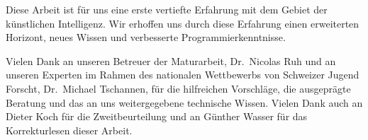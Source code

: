 Diese Arbeit ist für uns eine erste vertiefte Erfahrung mit dem Gebiet der
künstlichen Intelligenz. Wir erhoffen uns durch diese Erfahrung einen
erweiterten Horizont, neues Wissen und verbesserte Programmierkenntnisse.
    
Vielen Dank an unseren Betreuer der Maturarbeit, Dr.\ Nicolas Ruh und an unseren
Experten im Rahmen des nationalen Wettbewerbs von Schweizer Jugend Forscht, Dr.\
Michael Tschannen, für die hilfreichen Vorschläge, die ausgeprägte Beratung und
das an uns weitergegebene technische Wissen. Vielen Dank auch an Dieter Koch für
die Zweitbeurteilung und an Günther Wasser für das Korrekturlesen dieser Arbeit.
    